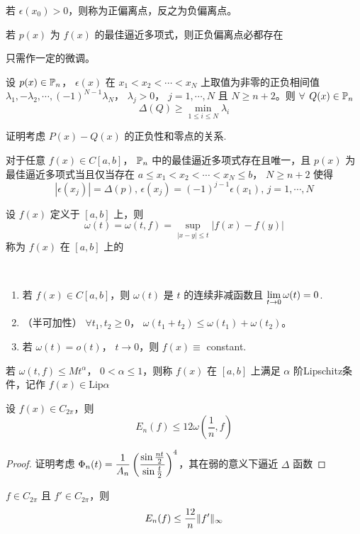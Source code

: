 若 $ \epsilon(x_0)>0 $，则称为正偏离点，反之为负偏离点。

\begin{lemma}
    若 $ p(x)  $ 为 $ f(x) $ 的最佳逼近多项式，则正负偏离点必都存在 
\end{lemma}
只需作一定的微调。

\begin{theorem}
    设 $ p(x)\in \mathbb P_n $， $ \epsilon(x) $ 在 $ x_1<x_2<\cdots<x_N $ 上取值为非零的正负相间值 $ \lambda_1,-\lambda_2,\cdots,(-1)^{N-1}\lambda_N $， $ \lambda_j>0 $， $ j=1,\cdots,N $ 且 $ N \geq n+2 $。则 $ \forall  $  $ Q(x)\in \mathbb P_n $
    \[\Delta(Q) \geq \min_{1 \leq i \leq N}\lambda_i\]        
\end{theorem}
证明考虑 $ P(x)-Q(x) $ 的正负性和零点的关系.
\begin{theorem}[Chebyshev]
    对于任意 $ f(x)\in C[a,b]  $， $ \mathbb P_n  $ 中的最佳逼近多项式存在且唯一，且 $ p(x)  $ 为最佳逼近多项式当且仅当存在 $ a \leq x_1<x_2<\cdots<x_N \leq b $，  $ N \geq n+2 $ 使得
    \[|\epsilon(x_j)|=\Delta(p),\,\epsilon(x_j)=(-1)^{j-1}\epsilon(x_1),\,j=1,\cdots,N\]   
\end{theorem}
\begin{definition}[连续模]
    设 $ f(x)  $ 定义于 $ [a,b] $ 上，则 
    \[\omega(t)=\omega(t,f)=\sup_{|x-y| \leq t}|f(x)-f(y)|\] 
    称为 $ f(x) $ 在 $ [a,b] $ 上的  
\end{definition}
\begin{proposition}
    \,\\
    \begin{enumerate}
        \item 若 $ f(x) \in C[a,b] $，则 $ \omega(t) $ 是 $ t $ 的连续非减函数且 $ \displaystyle\lim_{t\to0}\omega(t)=0 $.
        \item （半可加性） $ \forall t_1,t_2 \geq 0 $， $ \omega(t_1+t_2) \leq \omega(t_1)+\omega(t_2) $。
        \item 若 $ \omega(t)=o(t) $， $ t\rightarrow 0 $，则 $ f(x)\equiv  $ constant.         
    \end{enumerate}
\end{proposition}
\begin{definition}
    若 $ \omega(t,f) \leq Mt^\alpha $， $ 0<\alpha \leq 1 $，则称 $ f(x) $ 在 $ [a,b] $ 上满足 $ \alpha $ 阶Lipschitz条件，记作 $ f(x)\in \mathrm{Lip}\alpha $     
\end{definition}
\begin{theorem}[Jackson]
    设 $ f(x)\in C_{2\pi} $，则
    \[E_n(f) \leq 12\omega(\frac{1}{n},f)\] 
\end{theorem}
\begin{proof}
    证明考虑 $ \displaystyle\Phi_n(t)=\frac{1}{A_n}\left(\frac{\sin\frac{nt}{2}}{\sin\frac{t}{2}}\right)^4 $，其在弱的意义下逼近 $ \Delta $ 函数 
\end{proof}
\begin{corollary}
     $ f\in C_{2\pi} $ 且 $ f'\in C_{2\pi} $，则 
    \[E_n(f) \leq \displaystyle\frac{12}{n}\|f'\|_{\infty}\]  
\end{corollary}